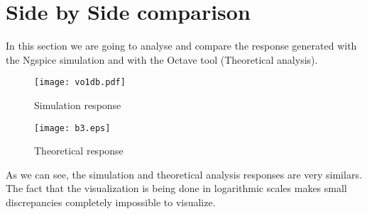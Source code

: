 \section{Side by Side comparison}
\label{sec:sidebyside}


In this section we are going to analyse and compare the response generated with the Ngspice simulation and with the Octave tool (Theoretical analysis). 

\begin{figure}[H]
  \centering
  \begin{minipage}[b]{0.45\textwidth}
    \texttt{[image: vo1db.pdf]}
    \caption{Simulation response}
    \label{fig:label_02}
  \end{minipage}
  \hfill
  \begin{minipage}[b]{0.52\textwidth}
    \texttt{[image: b3.eps]}
    \caption{Theoretical response}
    \label{fig:label_03}
  \end{minipage}
\end{figure}

As we can see, the simulation and theoretical analysis responses are very similars.
The fact that the visualization is being done in logarithmic scales makes small discrepancies completely impossible to visualize. 

